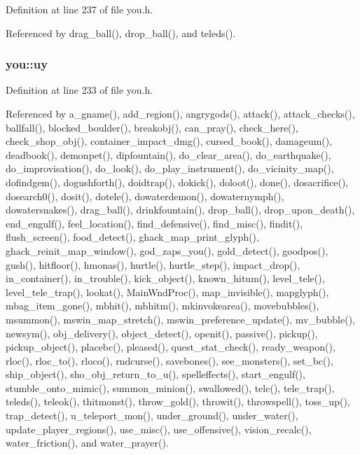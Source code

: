 Definition at line 237 of file you.\+h.



Referenced by drag\+\_\+ball(), drop\+\_\+ball(), and teleds().

\hypertarget{structyou_a8571cf3a9cfc41c3f877d0f56cda11a9}{
\subsubsection[{uy}]{ you\+::uy}}\label{structyou_a8571cf3a9cfc41c3f877d0f56cda11a9}


Definition at line 233 of file you.\+h.



Referenced by a\+\_\+gname(), add\+\_\+region(), angrygods(), attack(), attack\+\_\+checks(), ballfall(), blocked\+\_\+boulder(), breakobj(), can\+\_\+pray(), check\+\_\+here(), check\+\_\+shop\+\_\+obj(), container\+\_\+impact\+\_\+dmg(), cursed\+\_\+book(), damageum(), deadbook(), demonpet(), dipfountain(), do\+\_\+clear\+\_\+area(), do\+\_\+earthquake(), do\+\_\+improvisation(), do\+\_\+look(), do\+\_\+play\+\_\+instrument(), do\+\_\+vicinity\+\_\+map(), dofindgem(), dogushforth(), doidtrap(), dokick(), doloot(), done(), dosacrifice(), dosearch0(), dosit(), dotele(), dowaterdemon(), dowaternymph(), dowatersnakes(), drag\+\_\+ball(), drinkfountain(), drop\+\_\+ball(), drop\+\_\+upon\+\_\+death(), end\+\_\+engulf(), feel\+\_\+location(), find\+\_\+defensive(), find\+\_\+misc(), findit(), flush\+\_\+screen(), food\+\_\+detect(), ghack\+\_\+map\+\_\+print\+\_\+glyph(), ghack\+\_\+reinit\+\_\+map\+\_\+window(), god\+\_\+zaps\+\_\+you(), gold\+\_\+detect(), goodpos(), gush(), hitfloor(), hmonas(), hurtle(), hurtle\+\_\+step(), impact\+\_\+drop(), in\+\_\+container(), in\+\_\+trouble(), kick\+\_\+object(), known\+\_\+hitum(), level\+\_\+tele(), level\+\_\+tele\+\_\+trap(), lookat(), Main\+Wnd\+Proc(), map\+\_\+invisible(), mapglyph(), mbag\+\_\+item\+\_\+gone(), mbhit(), mbhitm(), mkinvokearea(), movebubbles(), msummon(), mswin\+\_\+map\+\_\+stretch(), mswin\+\_\+preference\+\_\+update(), mv\+\_\+bubble(), newsym(), obj\+\_\+delivery(), object\+\_\+detect(), openit(), passive(), pickup(), pickup\+\_\+object(), placebc(), pleased(), quest\+\_\+stat\+\_\+check(), ready\+\_\+weapon(), rloc(), rloc\+\_\+to(), rloco(), rndcurse(), savebones(), see\+\_\+monsters(), set\+\_\+bc(), ship\+\_\+object(), sho\+\_\+obj\+\_\+return\+\_\+to\+\_\+u(), spelleffects(), start\+\_\+engulf(), stumble\+\_\+onto\+\_\+mimic(), summon\+\_\+minion(), swallowed(), tele(), tele\+\_\+trap(), teleds(), teleok(), thitmonst(), throw\+\_\+gold(), throwit(), throwspell(), toss\+\_\+up(), trap\+\_\+detect(), u\+\_\+teleport\+\_\+mon(), under\+\_\+ground(), under\+\_\+water(), update\+\_\+player\+\_\+regions(), use\+\_\+misc(), use\+\_\+offensive(), vision\+\_\+recalc(), water\+\_\+friction(), and water\+\_\+prayer().

